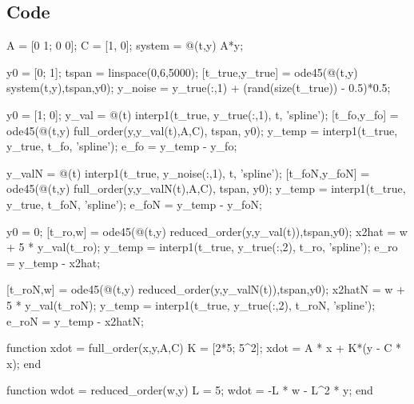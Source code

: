 
\subsection*{Code}
\begin{matlabcode}
A = [0 1; 0 0];
C = [1, 0];
system = @(t,y) A*y;

y0 = [0; 1];
tspan = linspace(0,6,5000);
[t_true,y_true] = ode45(@(t,y) system(t,y),tspan,y0);
y_noise = y_true(:,1) + (rand(size(t_true)) - 0.5)*0.5;

y0 = [1; 0];
y_val = @(t) interp1(t_true, y_true(:,1), t, 'spline');
[t_fo,y_fo] = ode45(@(t,y) full_order(y,y_val(t),A,C), tspan, y0);
y_temp = interp1(t_true, y_true, t_fo, 'spline');
e_fo = y_temp - y_fo;

y_valN = @(t) interp1(t_true, y_noise(:,1), t, 'spline');
[t_foN,y_foN] = ode45(@(t,y) full_order(y,y_valN(t),A,C), tspan, y0);
y_temp = interp1(t_true, y_true, t_foN, 'spline');
e_foN = y_temp - y_foN;

y0 = 0;
[t_ro,w] = ode45(@(t,y) reduced_order(y,y_val(t)),tspan,y0);
x2hat = w + 5 * y_val(t_ro);
y_temp = interp1(t_true, y_true(:,2), t_ro, 'spline');
e_ro = y_temp - x2hat;

[t_roN,w] = ode45(@(t,y) reduced_order(y,y_valN(t)),tspan,y0);
x2hatN = w + 5 * y_val(t_roN);
y_temp = interp1(t_true, y_true(:,2), t_roN, 'spline');
e_roN = y_temp - x2hatN;

function xdot = full_order(x,y,A,C)
    K = [2*5; 5^2]; %
    xdot = A * x + K*(y - C * x);
end

function wdot = reduced_order(w,y)
    L = 5; %
    wdot = -L * w - L^2 * y;
end
\end{matlabcode}
